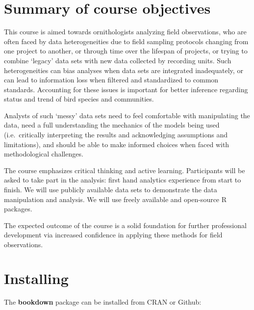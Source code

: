 \documentclass[12pt,]{scrbook}
\begin{document}
\hypertarget{summary-of-course-objectives}{%
\section{Summary of course objectives}\label{summary-of-course-objectives}}

This course is aimed towards ornithologists analyzing field observations,
who are often faced by data heterogeneities due to
field sampling protocols changing from one project to another,
or through time over the lifespan of projects, or trying to combine
`legacy' data sets with new data collected by recording units.
Such heterogeneities can bias analyses when data sets are integrated
inadequately, or can lead to information loss when filtered and standardized to
common standards. Accounting for these issues is important for better
inference regarding status and trend of bird species and communities.

Analysts of such `messy' data sets need to feel comfortable
with manipulating the data, need a full understanding the mechanics of the
models being used (i.e.~critically interpreting the results and acknowledging
assumptions and limitations), and should be able to make informed choices when
faced with methodological challenges.

The course emphasizes critical thinking and active learning.
Participants will be asked to take part in the analysis:
first hand analytics experience from start to finish.
We will use publicly available data sets to demonstrate the data manipulation
and analysis. We will use freely available and open-source R packages.

The expected outcome of the course is a solid foundation for further
professional development via increased confidence in applying these methods
for field observations.

\hypertarget{installing}{%
\section{Installing}\label{installing}}

The \textbf{bookdown} package can be installed from CRAN or Github:
\end{document}

